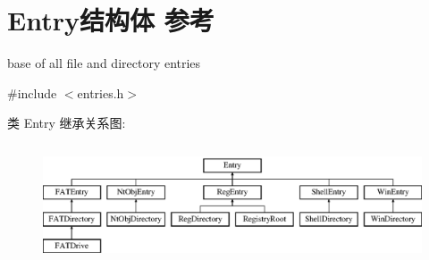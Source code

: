 \hypertarget{struct_entry}{}\section{Entry结构体 参考}
\label{struct_entry}


base of all file and directory entries  




{\ttfamily \#include $<$entries.\+h$>$}

类 Entry 继承关系图\+:\begin{figure}[H]
\begin{center}
\leavevmode
\includegraphics[height=3.555556cm]{struct_entry}
\end{center}
\end{figure}
